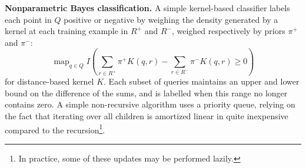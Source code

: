 \documentclass{article}
\DeclareMathOperator*{\map}{map}
\newcommand{\spos}{^{{\scriptscriptstyle +\!}}}
\newcommand{\sneg}{^{{\scriptscriptstyle -\!}}}
\begin{document}
{\bf Nonparametric Bayes classification.}
A simple kernel-based classifier labels each point in $Q$ positive or negative by weighing the density generated by a kernel at each training example in $R\spos$ and $R\sneg$, weighed respectively by priors $\pi\spos$ and $\pi\sneg$:
\begin{equation*}
\map_{q \in Q} I\!\!\left(\sum_{r \in R\spos} \pi\spos K(q,r) - \sum_{r \in R\sneg} \pi\sneg K(q,r) \geq 0 \right)
\end{equation*}
\noindent for distance-based kernel $K$.
Each subset of queries maintains an upper and lower bound on the difference of the sums, and is labelled when this range no longer contains zero.
A simple non-recursive algorithm uses a priority queue, relying on the fact that iterating over all children is amortized linear in quite inexpensive compared to the recursion\footnote{In practice, some of these updates may be performed lazily.}.
\end{document}
